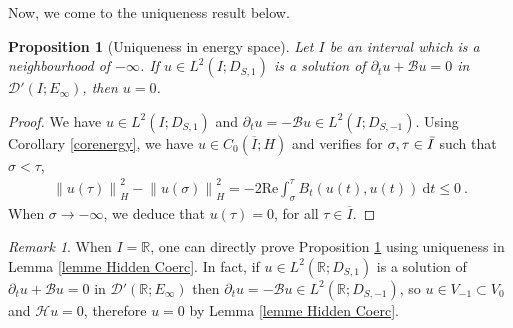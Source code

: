 \documentclass[11pt, letterpaper]{amsart}
\newtheorem{prop}[thm]{Proposition}
\theoremstyle{definition}
\theoremstyle{remark}
\newtheorem{rem}[thm]{Remark}
\numberwithin{equation}{section}
\begin{document}
{\noindent Now, we come to the uniqueness result below.
\begin{prop}[Uniqueness in energy space] \label{prop:uniqueness}
    Let $I$ be an interval which is a neighbourhood of $-\infty$. If $u \in L^2(I;D_{S,1})$ is a solution of $\partial_t u + \mathcal{B}u=0$ in $\mathcal{D}'(I;E_\infty)$, then $u=0$. 
\end{prop}
\begin{proof}
We have $u \in L^2(I;D_{S,1})$ and $\partial_t u = - \mathcal{B}u \in L^2(I;D_{S,-1})$. Using Corollary \ref{corenergy}, we have $u \in C_0(\overline{I};H)$ and verifies for $ \sigma, \tau \in \Bar{I}$ such that $  \sigma < \tau$, 
    \begin{align*}
        \left \| u(\tau) \right \|^2_H-\left \| u(\sigma) \right \|^2_H = - 2\mathrm{Re}\int_{\sigma}^{\tau} B_t (u(t), u(t)) \ \mathrm d t \leq 0 \ .
    \end{align*}
When $\sigma \to -\infty$, we deduce that $u(\tau)=0$, for all $\tau \in \overline{I}$.   
\end{proof}
\begin{rem}
When $I=\mathbb{R}$, one can directly prove Proposition \ref{prop:uniqueness} using uniqueness in Lemma \ref{lemme Hidden Coerc}. In fact, if $u \in L^2(\mathbb{R};D_{S,1})$ is a solution of $\partial_t u + \mathcal{B}u=0$ in $\mathcal{D}'(\mathbb{R};E_\infty)$ then $\partial_t u=-\mathcal{B}u \in L^2(\mathbb{R};D_{S,-1})$, so $u \in V_{-1} \subset V_0$ and $\mathcal{H}u=0$, therefore $u=0$ by Lemma \ref{lemme Hidden Coerc}.
\end{rem}
}
\end{document}
